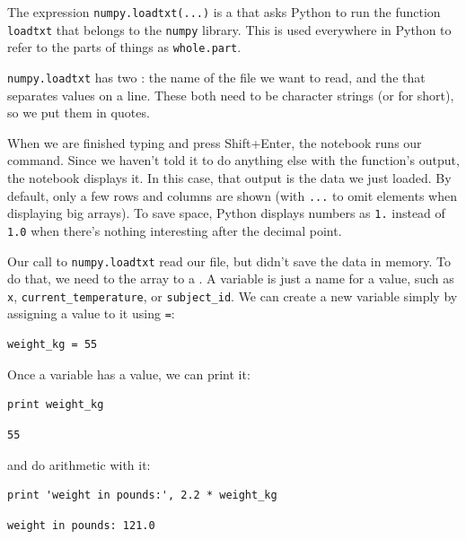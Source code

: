 \documentclass{book}
\begin{document}
The expression \texttt{numpy.loadtxt(...)} is a
 that asks Python to run the
function \texttt{loadtxt} that belongs to the \texttt{numpy} library.
This  is used everywhere in
Python to refer to the parts of things as \texttt{whole.part}.

\texttt{numpy.loadtxt} has two : the
name of the file we want to read, and the
 that separates values on a line. These
both need to be character strings (or  for
short), so we put them in quotes.

When we are finished typing and press Shift+Enter, the notebook runs our
command. Since we haven't told it to do anything else with the
function's output, the notebook displays it. In this case, that output
is the data we just loaded. By default, only a few rows and columns are
shown (with \texttt{...} to omit elements when displaying big arrays).
To save space, Python displays numbers as \texttt{1.} instead of
\texttt{1.0} when there's nothing interesting after the decimal point.

Our call to \texttt{numpy.loadtxt} read our file, but didn't save the
data in memory. To do that, we need to 
the array to a . A variable is just a
name for a value, such as \texttt{x}, \texttt{current\_temperature}, or
\texttt{subject\_id}. We can create a new variable simply by assigning a
value to it using \texttt{=}:

\begin{verbatim}
weight_kg = 55
\end{verbatim}

Once a variable has a value, we can print it:

\begin{verbatim}
print weight_kg
\end{verbatim}

\begin{verbatim}
55
\end{verbatim}

and do arithmetic with it:

\begin{verbatim}
print 'weight in pounds:', 2.2 * weight_kg
\end{verbatim}

\begin{verbatim}
weight in pounds: 121.0
\end{verbatim}
\end{document}
